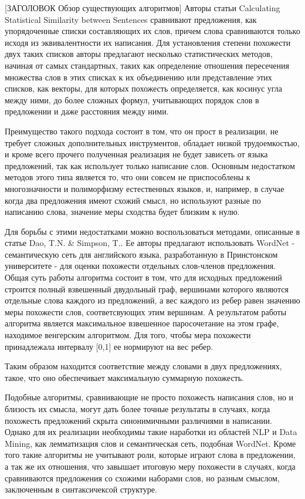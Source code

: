 [ЗАГОЛОВОК Обзор существующих алгоритмов]
Авторы статьи Calculating Statistical Similarity between Sentences\cite{statisticalSim} сравнивают предложения, 
как упорядоченные списки составляющих их слов, причем слова сравниваются только исходя из эквивалентности их написания. 
Для установления степени похожести двух таких списков авторы предлагают несколько статистических методов,
начиная от самых стандартных, таких как определение отношения пересечения множества слов в этих списках к их объединению
или представление этих списков, как векторы, для которых похожесть определяется, как косинус угла между ними,
до более сложных формул, учитывающих порядок слов в предложении и даже расстояния между ними.

Преимущество такого подхода состоит в том, что он прост в реализации, не требует
сложных дополнительных инструментов, обладает низкой трудоемкостью, и кроме всего
прочего полученная реализация не будет зависеть от языка предложений, 
так как использует только написание слов.
Основным недостатком методов этого типа является то, что они совсем
не приспособлены к многозначности и полиморфизму естественных языков, и,
например, в случае когда два предложения имеют схожий смысл, но используют разные по написанию слова,
значение меры сходства будет близким к нулю.

Для борьбы с этими недостатками можно воспользоваться методами, описанные в статье Dao, T.N. & Simpson, T.\cite{wordnetSim}.
Ее авторы предлагают использовать WordNet\cite{wordnet} - семантическую сеть для английского языка, 
разработанную в Принстонском университете - для оценки похожести отдельных слов-членов предложения.
Общая суть работы алгоритма состоит в том, что для исходных предложений
строится полный взвешенный двудольный граф, вершинами которого являются отдельные
слова каждого из предложений, а вес каждого из ребер равен значению меры похожести слов,
соответсвующих этим вершинам. А результатом работы алгоритма является максимальное
взвешенное паросочетание на этом графе, находимое венгерским алгоритмом.
Для того, чтобы мера похожести принадлежала интервалу [0,1] ее нормируют на вес ребер.

Таким образом находится соответствие между словами в двух предложениях, такое,
что оно обеспечивает максимальную суммарную похожесть.

Подобные алгоритмы, сравнивающие не просто похожесть написания слов, 
но и близость их смысла, могут дать более точные результаты в случаях, 
когда похожесть предложений скрыта синонимичными различиями в написании.
Однако для их реализации необходимы такие наработки из областей NLP и Data Mining, 
как лемматизация слов и семантическая сеть, подобная WordNet\cite{wordnet}.
Кроме того такие алгоритмы не учитывают роли, которые играют слова в предложении,
а так же их отношения, что завышает итоговую меру похожести в случаях,
когда сравниваются предложения со схожими наборами слов, но разным смыслом,
заключенным в синтаксичексой структуре.

